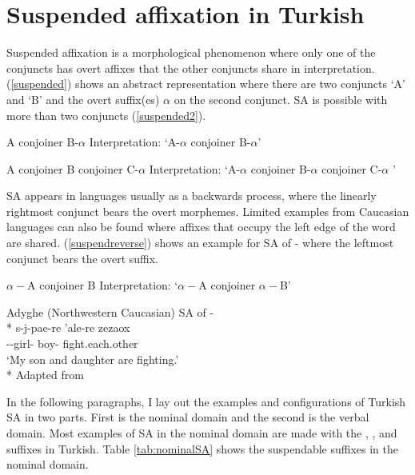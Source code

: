 \section{Suspended affixation in Turkish} \label{whatisSA}

Suspended affixation is a morphological phenomenon where only one of the conjuncts has overt affixes that the other conjuncts share in interpretation. (\ref{suspended}) shows an abstract representation where there are two conjuncts `A' and `B' and the overt suffix(es) $\alpha$ on the second conjunct. SA is possible with more than two conjuncts (\ref{suspended2}).
\begin{exe}
\ex \begin{xlist}
\ex \label{suspended} A conjoiner B-$\alpha$
\glt Interpretation: `A-$\alpha$ conjoiner B-$\alpha$'

\ex \label{suspended2} A conjoiner B conjoiner C-$\alpha$
\glt Interpretation: `A-$\alpha$ conjoiner B-$\alpha$ conjoiner C-$\alpha$ '
\end{xlist}
\end{exe}

SA appears in languages usually as a backwards process, where the linearly rightmost conjunct bears the overt morphemes. Limited examples from Caucasian languages can also be found where affixes that occupy the left edge of the word are shared. (\ref{suspendreverse}) shows an example for SA of {\Fsg-\All} where the leftmost conjunct bears the overt suffix.
\begin{exe}
\ex \label{suspendreverse}
    \begin{xlist}
        \ex $\alpha-$A conjoiner B
        \glt Interpretation: `$\alpha-$A conjoiner $\alpha-$B'
        
        \ex Adyghe (Northwestern Caucasian) SA of {\Fsg-\All} \\*
        \gll s-j\textschwa-p\textctc a\textctc e-re \textteshlig'ale-re zezaox
        \\ {\Fsg}-{\All}-girl-{\And} boy-{\And} fight.each.other \\
        \glt `My son and daughter are fighting.'\\*
        \hfill Adapted from \cite{erschler2012suspended}
    \end{xlist}
\end{exe}

In the following paragraphs, I lay out the examples and configurations of Turkish SA in two parts. First is the nominal domain and the second is the verbal domain. Most examples of SA in the nominal domain are made with the {\Case}, {\Poss}, and {\Pl} suffixes in Turkish. Table \ref{tab:nominalSA} shows the suspendable suffixes in the nominal domain.

